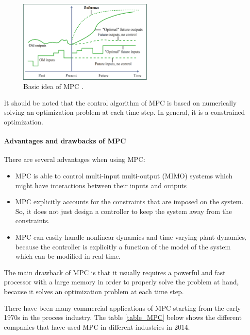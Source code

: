 \documentclass{thesisreport}
\begin{document}
 
 \begin{figure}[h]
 \centering
 \includegraphics[width=0.6\textwidth]{Images/control/MPC_general_idea}
 \caption{Basic idea of MPC \cite{How2008}.}
 \label{MPC_basic_idea}
\end{figure}  
 
\noindent It should be noted that the control algorithm of MPC is based on numerically solving an optimization problem at each time step. In general, it is a constrained optimization.
 
 \paragraph{Advantages and drawbacks of MPC} There are several advantages when using MPC: 
 
 \begin{itemize}
 	\item MPC is able to control multi-input multi-output (MIMO) systems which might have interactions between their inputs and outputs
 	\item MPC explicitly accounts for the constraints that are imposed on the system. So, it does not just design a controller to keep the system away from the constraints.
 	\item MPC can easily handle nonlinear dynamics and time-varying plant dynamics, because the controller is explicitly a function of the model of the system which can be modified in real-time.
 \end{itemize}

\noindent The main drawback of MPC is that it usually requires a powerful and fast processor with a large memory in order to properly solve the problem at hand, because it solves an optimization problem at each time step.
 
\noindent There have been many commercial applications of MPC starting from the early 1970s in the process industry. The table \ref{table_MPC} below shows the different companies that have used MPC in different industries in 2014.
 
\end{document}
